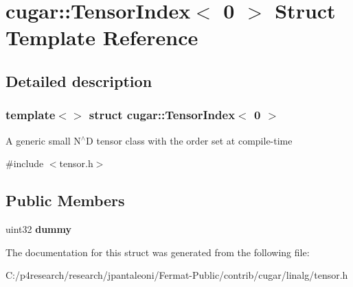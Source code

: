 \hypertarget{structcugar_1_1_tensor_index_3_010_01_4}{}\section{cugar\+:\+:Tensor\+Index$<$ 0 $>$ Struct Template Reference}
\label{structcugar_1_1_tensor_index_3_010_01_4}


\subsection{Detailed description}
\subsubsection*{template$<$$>$\newline
struct cugar\+::\+Tensor\+Index$<$ 0 $>$}

A generic small N$^\wedge$D tensor class with the order set at compile-\/time 

{\ttfamily \#include $<$tensor.\+h$>$}

\subsection*{Public Members}
\begin{DoxyCompactItemize}
\item 
\mbox{\label{structcugar_1_1_tensor_index_3_010_01_4_a7a14cd1fb7d20e88f03b512efcd39f33}} 
uint32 {\bfseries dummy}
\end{DoxyCompactItemize}


The documentation for this struct was generated from the following file\+:\begin{DoxyCompactItemize}
\item 
C\+:/p4research/research/jpantaleoni/\+Fermat-\/\+Public/contrib/cugar/linalg/tensor.\+h\end{DoxyCompactItemize}
